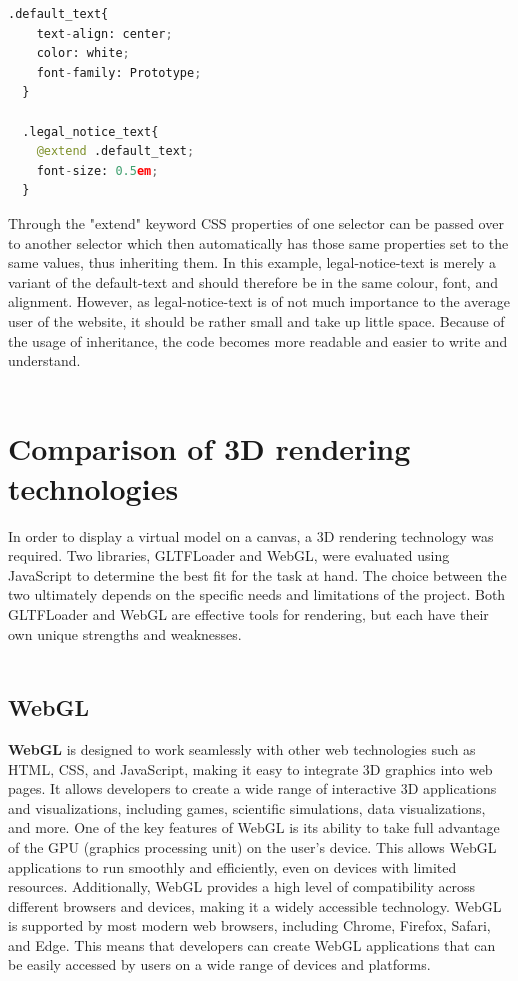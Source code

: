 \begin{lstlisting}[language=Python,caption=Textstyling in Sass,label=lst:sass]
  .default_text{
    text-align: center;
    color: white;
    font-family: Prototype;
  }

  .legal_notice_text{
    @extend .default_text;
    font-size: 0.5em;
  }
\end{lstlisting}

Through the "extend" keyword CSS properties of one selector can be passed over to another selector which then automatically has those 
same properties set to the same values, thus inheriting them. In this example, legal-notice-text is merely a variant of the 
default-text and should therefore be in the same colour, font, and alignment. However, as legal-notice-text is of not much 
importance to the average user of the website, it should be rather small and take up little space. Because of the usage of 
inheritance, the code becomes more readable and easier to write and understand. \cite{SassInheritance}
\\
\\
\section{Comparison of 3D rendering technologies}
In order to display a virtual model on a canvas, a 3D rendering technology was required. Two libraries, 
GLTFLoader and WebGL, were evaluated using JavaScript to determine the best fit for the task at hand. 
The choice between the two ultimately depends on the specific needs and limitations of the project. 
Both GLTFLoader and WebGL are effective tools for rendering, but each have their own 
unique strengths and weaknesses.
\\
\\
\subsection{WebGL}
\textbf{WebGL} is designed to work seamlessly with other web technologies such as HTML, CSS, and JavaScript, 
making it easy to integrate 3D graphics into web pages. It allows developers to create a wide range 
of interactive 3D applications and visualizations, including games, scientific 
simulations, data visualizations, and more.
One of the key features of WebGL is its ability to take full advantage of the GPU 
(graphics processing unit) on the user's device. This allows WebGL applications to 
run smoothly and efficiently, even on devices with limited resources. Additionally, WebGL provides 
a high level of compatibility across different browsers and devices, making it a widely accessible technology.
WebGL is supported by most modern web browsers, including Chrome, Firefox, Safari, and Edge. 
This means that developers can create WebGL applications that can be easily accessed by 
users on a wide range of devices and platforms. \cite{WebGL}
\\
\\
